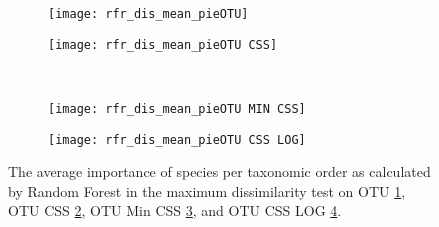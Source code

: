 \begin{figure}[h]
	\centering
	\begin{subfigure}{0.45\textwidth}
		\texttt{[image: rfr\_dis\_mean\_pieOTU]}
		\caption{}
		\label{fig:dissimotu}
	\end{subfigure}
	\begin{subfigure}{0.45\textwidth}
		\texttt{[image: rfr\_dis\_mean\_pieOTU CSS]}
		\caption{}
		\label{fig:dissimotucss}
	\end{subfigure}\\	
	\begin{subfigure}{0.45\textwidth}
		\texttt{[image: rfr\_dis\_mean\_pieOTU MIN CSS]}
		\caption{}
		\label{fig:dissimotumincss}
	\end{subfigure}
	\begin{subfigure}{0.45\textwidth}
		\texttt{[image: rfr\_dis\_mean\_pieOTU CSS LOG]}
		\caption{}
		\label{fig:dissimotucsslog}
	\end{subfigure}
	\caption{The average importance of species per taxonomic order as calculated by Random Forest in the maximum dissimilarity test on OTU \ref{fig:dissimotu}, OTU CSS \ref{fig:dissimotucss}, OTU Min CSS \ref{fig:dissimotumincss}, and OTU CSS LOG \ref{fig:dissimotucsslog}.  }
	\label{fig:dispie}
\end{figure}
%
